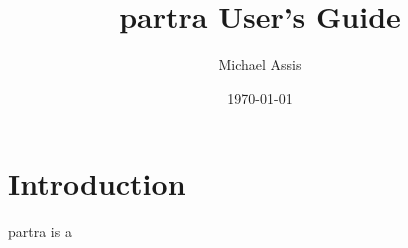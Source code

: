 \documentclass{article}
\begin{document}
\title{partra User's Guide}
\author{Michael Assis}
\date{\today}
\maketitle


\section{Introduction}
partra is a 
\end{document}
